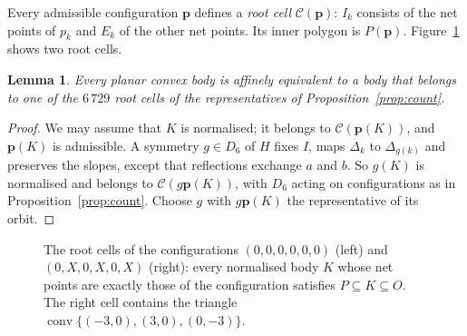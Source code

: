 \documentclass[11pt]{amsart}
\newtheorem{lemma}[theorem]{Lemma}
\theoremstyle{definition}
\theoremstyle{remark}
\DeclareMathOperator{\conv}{conv}
\newcommand{\C}{\mathcal C}
\begin{document}
Every admissible configuration $\mathbf p$ defines a \emph{root cell} $\C(\mathbf p)$: $I_k$ consists of the net points of $p_k$ and
$E_k$ of the other net points. Its inner polygon is $P(\mathbf p)$. Figure~\ref{fig:cells} shows two root cells.

\begin{lemma}\label{lem:roots}
Every planar convex body is affinely equivalent to a body that belongs to one of the $6\,729$ root cells of the
representatives of Proposition~\ref{prop:count}.
\end{lemma}

\begin{proof}
We may assume that $K$ is normalised; it belongs to $\C(\mathbf p(K))$, and $\mathbf p(K)$ is admissible. A symmetry
$g\in D_6$ of $H$ fixes $I$, maps $\Delta_k$ to $\Delta_{g(k)}$ and preserves the slopes, except that reflections exchange
$a$ and $b$. So $g(K)$ is normalised and belongs to $\C(g\mathbf p(K))$, with $D_6$ acting on configurations as in
Proposition~\ref{prop:count}. Choose $g$ with $g\mathbf p(K)$ the representative of its orbit.
\end{proof}

\begin{figure}[t]
\centering
{}\qquad
{}
\caption{The root cells of the configurations $(0,0,0,0,0,0)$ (left) and $(0,X,0,X,0,X)$ (right): every normalised body $K$
whose net points are exactly those of the configuration satisfies $P\subseteq K\subseteq O$. The right cell contains the triangle
$\conv\{(-3,0),(3,0),(0,-3)\}$.}
\label{fig:cells}
\end{figure}
\end{document}
